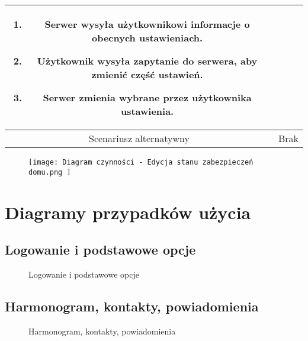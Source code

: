 \documentclass{article}
\begin{document}
\begin{enumerate}
\begin{enumerate}
\begin{table}[H]
\begin{tabular}{|c|p{7cm}|}
\begin{enumerate}
\item Serwer wysyła użytkownikowi informacje o obecnych ustawieniach.

\item Użytkownik wysyła zapytanie do serwera, aby zmienić część ustawień.

\item Serwer zmienia wybrane przez użytkownika ustawienia.\end{enumerate} \\
						\hline
						Scenariusz alternatywny & Brak                                                                                                                                                                                                                                                                                                                          \\
						\hline
					\end{tabular}
				\end{table}
		\end{enumerate}
	\end{enumerate}

	\begin{figure}[H]
		\centering
		\texttt{[image: 
			Diagram czynności - Edycja stanu zabezpieczeń domu.png
		]}
	\end{figure}

	\newpage

	\section{Diagramy przypadków użycia}

	\subsection{Logowanie i podstawowe opcje}
	\begin{figure}[H]
		\centering
		\noindent
		\captionsetup{labelformat=empty}
		\caption{Logowanie i podstawowe opcje}
	\end{figure}

	\newpage
	\subsection{Harmonogram, kontakty, powiadomienia}
	\begin{figure}[H]
		\centering
		\noindent
		\captionsetup{labelformat=empty}
		\caption{Harmonogram, kontakty, powiadomienia}
	\end{figure}
\end{document}
